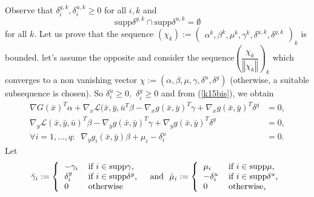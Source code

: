        	Observe that $\delta_{i}^{g,k},\delta_{i}^{u,k}\geq0$ for all $i,k$ and
       	\begin{equation}
       	\mathrm{supp}\delta^{g,k}\cap\mathrm{supp}\delta^{u,k}=\emptyset\label{15b}
       	\end{equation}
       	for all $k.$ 
        Let us prove that the sequence $(\chi_{k}):=
       	\begin{pmatrix}
       	\alpha^{k},\beta^{k},\mu^{k},\gamma^{k},\delta^{u,k},\delta^{g,k}
       	\end{pmatrix}_{k}$ is bounded. let's assume the opposite and consider the sequence$\left(  \dfrac{\chi_{k}}{\left\Vert \chi_{k}\right\Vert }\right)  _{k}$ which converges to a non vanishing vector $\chi:=(\alpha,\beta,\mu,\gamma,\delta^{u},\delta^{g})$ (otherwise, a suitable subsequence is chosen). So $\delta_{i}^{u}\geq0,$ $\delta_{i}^{g}\geq0$ and from (\ref{k15bis}), we obtain
       	\begin{align}
       	\nabla G(\bar{x})^{T}\alpha+\nabla_{x}\mathcal{L}(\bar{x},\bar{y},\bar{u}^{T}\beta-\nabla_{x}g(\bar{x},\bar{y})^{T}\gamma+\nabla_{x}g(\bar{x},\bar{y})^{T}\delta^{g}  & =0,\label{k18bis}\\
        \nabla_{y}\mathcal{L}(\bar{x},\bar{y},\bar{u})^{T}\beta-\nabla_{y}g(\bar{x},\bar{y})^{T}\gamma
        +\nabla_{y}g(\bar{x},\bar{y})^{T}\delta^{g} & =0, \label{k19bis}\\
       \forall i=1,\ldots, q: \;\; \nabla_{y}g_{i}(\bar{x},\bar{y})\beta+\mu_{i}-\delta_{i}^{u}  & =0.\label{k19b}
       \end{align}
       	Let
       	\begin{equation}
       	\tilde{\gamma}_{i}:=\left\{
       	\begin{tabular}
       	[c]{ll}
       	$-\gamma_{i}$ & if $i\in\mathrm{supp}\gamma$,\\
       	$\delta_{i}^{g}$ & if $i\in\mathrm{supp}\delta^{g}$,\\
       	$0$ & otherwise
       	\end{tabular}
       	\right.  \text{ \ and \ }\tilde{\mu}_{i}:=\left\{
       	\begin{tabular}
       	[c]{ll}%
       	$\mu_{i}$ & if $i\in\mathrm{supp}\mu$,\\
       	$-\delta_{i}^{u}$ & if $i\in\mathrm{supp}\delta^{u}$,\\
       	$0$ & otherwise,
       	\end{tabular}
       	\right. \label{k20}
       	\end{equation}
